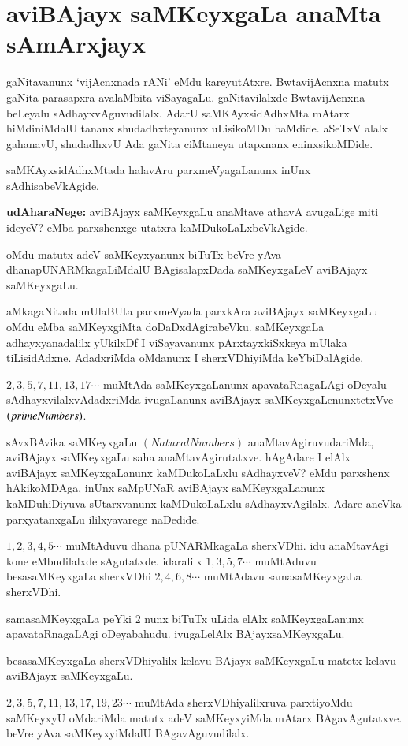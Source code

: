 \chapter{aviBAjayx saMKeyxgaLa anaMta sAmArxjayx}


gaNitavanunx `vijAcnxnada rANi' eMdu kareyutAtxre. BwtavijAcnxna matutx gaNita \-parasapxra avalaMbita viSayagaLu. gaNitavilalxde BwtavijAcnxna beLeyalu sAdhayxvAguvudilalx. AdarU saMKAyxsidAdhxMta mAtarx hiMdiniMdalU tananx shudadhxteyanunx uLisikoMDu baMdide. aSeTxV alalx gahanavU, shudadhxvU Ada gaNita ciMtaneya utapxnanx eninxsikoMDide.

saMKAyxsidAdhxMtada halavAru parxmeVyagaLanunx inUnx sAdhisabeVkAgide. 

\textbf{udAharaNege:} aviBAjayx saMKeyxgaLu anaMtave athavA avugaLige miti ideyeV? eMba parxshenxge utatxra kaMDukoLaLxbeVkAgide. 

oMdu matutx adeV saMKeyxyanunx biTuTx beVre yAva dhanapUNARMkagaLiMdalU BAgisalapxDada saMKeyxgaLeV aviBAjayx saMKeyxgaLu.

aMkagaNitada mUlaBUta parxmeVyada parxkAra aviBAjayx saMKeyxgaLu oMdu eMba saMKeyxgiMta doDaDxdAgirabeVku. saMKeyxgaLa adhayxyanadalilx yUkilxDf I viSayavanunx pArxtayxkiSxkeya mUlaka tiLisidAdxne. AdadxriMda oMdanunx I sherxVDhiyiMda keYbiDalAgide.
 
 $2,3,5,7,11,13,17\cdots$ muMtAda saMKeyxgaLanunx apavataRnagaLAgi oDe\break yalu sAdhayxvilalxvAdadxriMda ivugaLanunx aviBAjayx saMKeyxgaLenunxtetxVve $(prime\- Numbers)$.

sAvxBAvika saMKeyxgaLu $(Natural Numbers)$ anaMtavAgiruvudariMda, avi\-BAjayx saMKeyxgaLu saha anaMtavAgirutatxve. hAgAdare I elAlx aviBAjayx saMKeyxgaLanunx kaMDukoLaLxlu sAdhayxveV? eMdu parxshenx hAkikoMDAga, inUnx saMpUNaR aviBAjayx saMKeyxgaLanunx kaMDuhiDiyuva sUtarxvanunx kaMDukoLaLxlu sAdhayxvAgilalx. Adare aneVka parxyatanxgaLu ililxyavarege naDedide.

$1,2,3,4,5\cdots$ muMtAduvu dhana pUNARMkagaLa sherxVDhi. idu anaMtavAgi kone eMbudilalxde sAgutatxde. idaralilx $1,3,5,7\cdots$ muMtAduvu besasaMKeyxgaLa sherxVDhi $2,4,6,8\cdots$ muMtAdavu samasaMKeyxgaLa sherxVDhi.

samasaMKeyxgaLa peYki $2$ nunx biTuTx uLida elAlx saMKeyxgaLanunx apavataRnagaLAgi oDeyabahudu. ivugaLelAlx BAjayxsaMKeyxgaLu.

besasaMKeyxgaLa sherxVDhiyalilx kelavu BAjayx saMKeyxgaLu matetx kelavu aviBAjayx saMKeyx\-gaLu.

$2,3,5,7,11,13,17,19,23\cdots$ muMtAda sherxVDhiyalilxruva parxtiyoMdu saMKeyxyU oMdariMda matutx adeV saMKeyxyiMda mAtarx BAgavAgutatxve. beVre yAva saMKeyxyiMdalU BAgavAguvudilalx.

